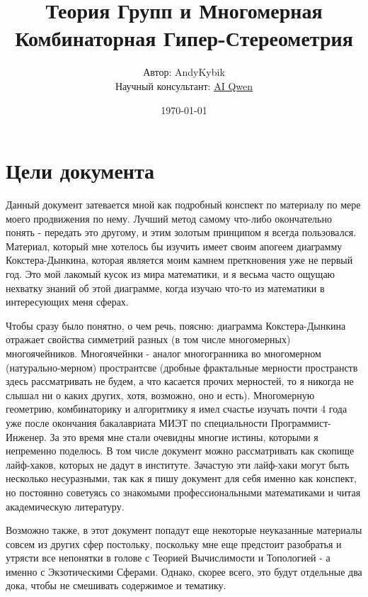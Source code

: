 \documentclass{book}
\title{Теория Групп и Многомерная Комбинаторная Гипер-Стереометрия}
\author{Автор: AndyKybik \\ Научный консультант: \href{https://chat.qwen.ai/}{\underline{AI Qwen}}}
\date{\today}
\begin{document}
\maketitle

\tableofcontents

{

\clearpage
{} %
\section*{Цели документа}


Данный документ затевается мной  как подробный конспект по материалу по мере моего продвижения по нему. Лучший метод самому что-либо окончательно понять - передать это другому, и этим золотым принципом я всегда пользовался. Материал, который мне хотелось бы изучить имеет своим апогеем диаграмму Кокстера-Дынкина, которая является моим камнем преткновения уже не первый год. Это мой лакомый кусок из мира математики, и я весьма часто ощущаю нехватку знаний об этой диаграмме, когда изучаю что-то из математики в интересующих меня сферах.

Чтобы сразу было понятно, о чем речь, поясню: диаграмма Кокстера-Дынкина отражает свойства симметрий разных (в том числе многомерных) многоячейников. Многоячейнки - аналог многогранника во многомерном (натурально-мерном) пространтсве (дробные фрактальные мерности пространств здесь рассматривать не будем, а что касается прочих мерностей, то я никогда не слышал ни о каких других, хотя, возможно, оно и есть). Многомерную геометрию, комбинаторику и алгоритмику я имел счастье изучать почти 4 года уже после окончания бакалавриата МИЭТ по специальности Программист-Инженер. За это время мне стали очевидны многие истины, которыми я непременно поделюсь. В том числе документ можно рассматривать как скопище лайф-хаков, которых не дадут в институте. Зачастую эти лайф-хаки могут быть несколько несуразными, так как я пишу документ для себя именно как конспект, но постоянно советуясь со знакомыми профессиональными математиками и читая академическую литературу.

Возможно также, в этот документ попадут еще некоторые неуказанные материалы совсем из других сфер постольку, поскольку мне еще предстоит разобратья и утрясти все непонятки в голове с Теорией Вычислимости и Топологией - а именно с Экзотическими Сферами. Однако, скорее всего, это будут отдельные два дока, чтобы не смешивать содержимое и тематику.

}
\end{document}
